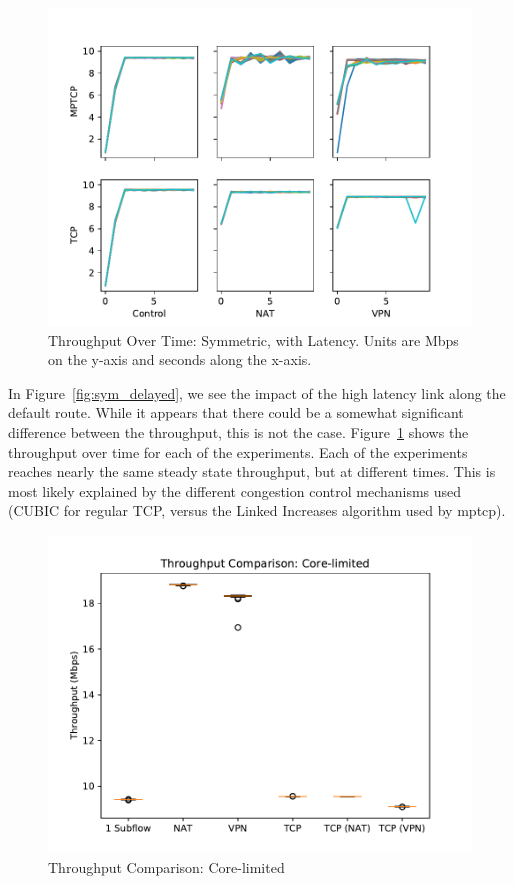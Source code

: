 \documentclass{cwru}
\begin{document}
\begin{figure}[p]
  \centering
  \includegraphics[height=0.42\textheight]{figures/timegrid-sym-delayed.pdf}
  \caption[Throughput Over Time: Symmetric, with Latency]{Throughput Over Time:
    Symmetric, with Latency. Units are Mbps on the y-axis and seconds along the
    x-axis.}
  \label{fig:timegrid_sym_delayed}
\end{figure}

In Figure~\ref{fig:sym_delayed}, we see the impact of the high latency link
along the default route. While it appears that there could be a somewhat
significant difference between the throughput, this is not the case.
Figure~\ref{fig:timegrid_sym_delayed} shows the throughput over time for
each of the experiments. Each of the experiments reaches nearly the same steady
state throughput, but at different times. This is most likely explained by the
different congestion control mechanisms used (CUBIC for regular TCP, versus the
Linked Increases algorithm used by \ac{mptcp}).

\begin{figure}[p]
  \centering
  \includegraphics[height=0.45\textheight]{figures/easy.pdf}
  \caption{Throughput Comparison: Core-limited}
  \label{fig:easy}
\end{figure}
\end{document}
